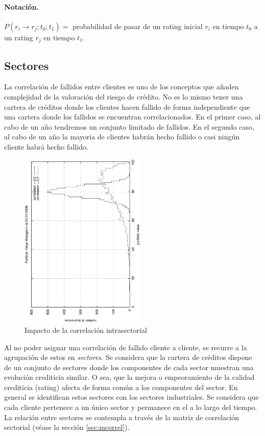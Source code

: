 \paragraph{Notaci\'on.} $P(r_i \to r_j;t_0;t_1) =$ probabilidad de pasar de un 
rating inicial $r_i$ en tiempo $t_0$ a un rating $r_j$ en tiempo $t_1$.


\subsection{Sectores}

La correlaci\'on de fallidos entre clientes es uno de los conceptos que
a\~naden complejidad de la valoraci\'on del riesgo de cr\'edito. No es lo
mismo tener una cartera de cr\'editos donde los clientes hacen fallido 
de forma independiente que una cartera donde los fallidos se encuentran 
correlacionados. En el primer caso, al cabo de un a\~no tendremos un 
conjunto limitado de fallidos. En el segundo caso, al cabo de un a\~no la 
mayoria de clientes habr\'an hecho fallido o casi ning\'un cliente habr\'a
hecho fallido.

\begin{figure}[!hb]
\begin{center}
\includegraphics[width=6cm,angle=-90]{./images/sectorcorrel.ps}
\caption{Impacto de la correlaci\'on intrasectorial}
\label{sectorcorrel}
\end{center}
\end{figure}

Al no poder asignar una correlaci\'on de fallido cliente a cliente, se recurre
a la agrupaci\'on de estos en \emph{sectores}. Se considera que
la cartera de cr\'editos dispone de un conjunto de sectores donde los componentes
de cada sector muestran una evoluci\'on crediticia similar. O sea, que la mejora
o empeoramiento de la calidad crediticia (rating) afecta de forma com\'un a los
componentes del sector. En general se identifican estos sectores con los 
sectores industriales. 
\newline
\newline
Se considera que cada cliente pertenece a un \'unico sector y permanece en 
el a lo largo del tiempo. La relaci\'on entre sectores se contempla a trav\'es 
de la matriz de correlaci\'on sectorial (v\'ease la secci\'on \ref{sec:mcorrel}).

